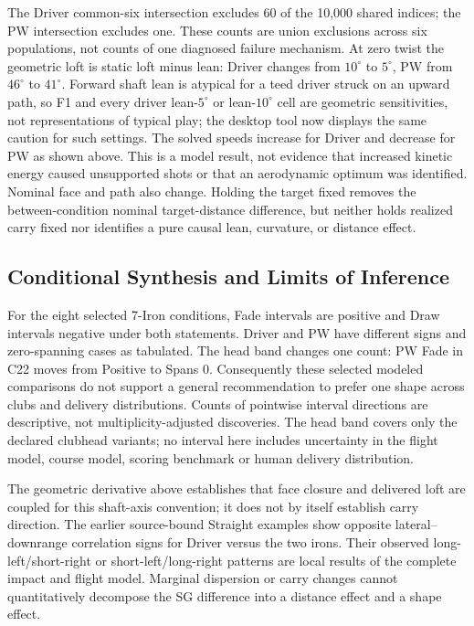 \documentclass[11pt,letterpaper]{article}
\begin{document}
The Driver common-six intersection excludes 60 of the 10,000 shared indices; the PW intersection excludes one. These counts are union exclusions across six populations, not counts of one diagnosed failure mechanism. At zero twist the geometric loft is static loft minus lean: Driver changes from $10^\circ$ to $5^\circ$, PW from $46^\circ$ to $41^\circ$. Forward shaft lean is atypical for a teed driver struck on an upward path, so F1 and every driver lean-$5^\circ$ or lean-$10^\circ$ cell are geometric sensitivities, not representations of typical play; the desktop tool now displays the same caution for such settings. The solved speeds increase for Driver and decrease for PW as shown above. This is a model result, not evidence that increased kinetic energy caused unsupported shots or that an aerodynamic optimum was identified. Nominal face and path also change. Holding the target fixed removes the between-condition nominal target-distance difference, but neither holds realized carry fixed nor identifies a pure causal lean, curvature, or distance effect.

\subsection{Conditional Synthesis and Limits of Inference}



For the eight selected 7-Iron conditions, Fade intervals are positive and Draw intervals negative under both statements. Driver and PW have different signs and zero-spanning cases as tabulated. The head band changes one count: PW Fade in C22 moves from Positive to Spans 0. Consequently these selected modeled comparisons do not support a general recommendation to prefer one shape across clubs and delivery distributions. Counts of pointwise interval directions are descriptive, not multiplicity-adjusted discoveries. The head band covers only the declared clubhead variants; no interval here includes uncertainty in the flight model, course model, scoring benchmark or human delivery distribution.

The geometric derivative above establishes that face closure and delivered loft are coupled for this shaft-axis convention; it does not by itself establish carry direction. The earlier source-bound Straight examples show opposite lateral--downrange correlation signs for Driver versus the two irons. Their observed long-left/short-right or short-left/long-right patterns are local results of the complete impact and flight model. Marginal dispersion or carry changes cannot quantitatively decompose the SG difference into a distance effect and a shape effect.
\end{document}
